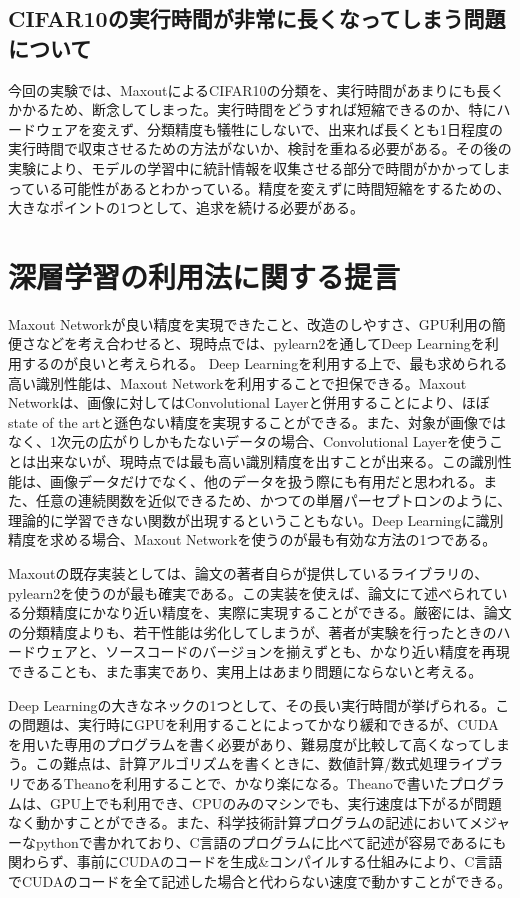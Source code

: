 \subsection{CIFAR10の実行時間が非常に長くなってしまう問題について}
今回の実験では、MaxoutによるCIFAR10の分類を、実行時間があまりにも長くかかるため、断念してしまった。実行時間をどうすれば短縮できるのか、特にハードウェアを変えず、分類精度も犠牲にしないで、出来れば長くとも1日程度の実行時間で収束させるための方法がないか、検討を重ねる必要がある。その後の実験により、モデルの学習中に統計情報を収集させる部分で時間がかかってしまっている可能性があるとわかっている。精度を変えずに時間短縮をするための、大きなポイントの1つとして、追求を続ける必要がある。


\section{深層学習の利用法に関する提言}
Maxout Networkが良い精度を実現できたこと、改造のしやすさ、GPU利用の簡便さなどを考え合わせると、現時点では、pylearn2を通してDeep Learningを利用するのが良いと考えられる。
Deep Learningを利用する上で、最も求められる高い識別性能は、Maxout Networkを利用することで担保できる。Maxout Networkは、画像に対してはConvolutional Layerと併用することにより、ほぼstate of the artと遜色ない精度を実現することができる。また、対象が画像ではなく、1次元の広がりしかもたないデータの場合、Convolutional Layerを使うことは出来ないが、現時点では最も高い識別精度を出すことが出来る。この識別性能は、画像データだけでなく、他のデータを扱う際にも有用だと思われる。また、任意の連続関数を近似できるため、かつての単層パーセプトロンのように、理論的に学習できない関数が出現するということもない。Deep Learningに識別精度を求める場合、Maxout Networkを使うのが最も有効な方法の1つである。\par
Maxoutの既存実装としては、論文の著者自らが提供しているライブラリの、pylearn2を使うのが最も確実である。この実装を使えば、論文にて述べられている分類精度にかなり近い精度を、実際に実現することができる。厳密には、論文の分類精度よりも、若干性能は劣化してしまうが、著者が実験を行ったときのハードウェアと、ソースコードのバージョンを揃えずとも、かなり近い精度を再現できることも、また事実であり、実用上はあまり問題にならないと考える。\par
Deep Learningの大きなネックの1つとして、その長い実行時間が挙げられる。この問題は、実行時にGPUを利用することによってかなり緩和できるが、CUDAを用いた専用のプログラムを書く必要があり、難易度が比較して高くなってしまう。この難点は、計算アルゴリズムを書くときに、数値計算/数式処理ライブラリであるTheanoを利用することで、かなり楽になる。Theanoで書いたプログラムは、GPU上でも利用でき、CPUのみのマシンでも、実行速度は下がるが問題なく動かすことができる。また、科学技術計算プログラムの記述においてメジャーなpythonで書かれており、C言語のプログラムに比べて記述が容易であるにも関わらず、事前にCUDAのコードを生成\&コンパイルする仕組みにより、C言語でCUDAのコードを全て記述した場合と代わらない速度で動かすことができる。\par
